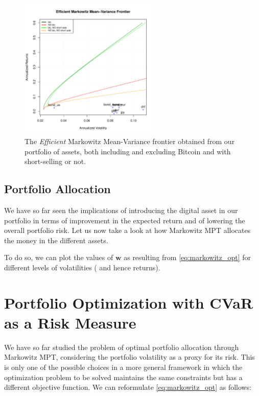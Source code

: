 \begin{figure}
	\centering
	\includegraphics[width=0.6\textwidth]{Images/efficient_frontier.pdf}
	\caption{The \textit{Efficient} Markowitz Mean-Variance frontier obtained from our portfolio of assets, both including and excluding Bitcoin and with short-selling or not.}
	\label{fig:efficient_frontier_comparison}
\end{figure}


\subsection{Portfolio Allocation}
We have so far seen the implications of introducing the digital asset in our portfolio in terms of improvement in the expected return and of lowering the overall portfolio risk.
Let us now take a look at how Markowitz MPT allocates the money in the different assets.

To do so, we can plot the values of $\mathbf{w}$ as resulting from \eqref{eq:markowitz_opt} for different levels of volatilities ( and hence returns).



\section{Portfolio Optimization with CVaR as a Risk Measure}
We have so far studied the problem of optimal portfolio allocation through Markowitz MPT, considering the portfolio volatility as a proxy for its risk.
This is only one of the possible choices in a more general framework in which the optimization problem to be solved maintains the same constraints but has a  different objective function. We can reformulate \eqref{eq:markowitz_opt} as follows:

